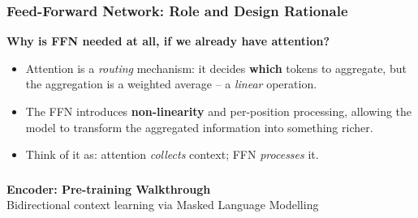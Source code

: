 \begin{frame}[fragile]\frametitle{Feed-Forward Network: Role and Design Rationale}
\textbf{Why is FFN needed at all, if we already have attention?}
\begin{itemize}
\item Attention is a \emph{routing} mechanism: it decides \textbf{which} tokens to
      aggregate, but the aggregation is a weighted average – a \emph{linear} operation.
\item The FFN introduces \textbf{non-linearity} and per-position processing,
      allowing the model to transform the aggregated information into something richer.
\item Think of it as: attention \emph{collects} context; FFN \emph{processes} it.
\end{itemize}
\end{frame}


\begin{frame}[fragile]\frametitle{}
\begin{center}
{\Large \textbf{Encoder: Pre-training Walkthrough}}\\[0.5em]
{\normalsize Bidirectional context learning via Masked Language Modelling}
\end{center}
\end{frame}

